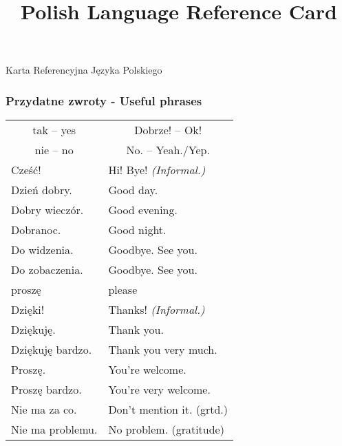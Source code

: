 \documentclass[12pt]{refcard}
\title{Polish Language Reference Card}
\newcommand{\singlec}[1]{\multicolumn{1}{c}{#1}}
\begin{document}
\centering

\maketitle
\vspace{-1ex}
Karta Referencyjna Języka Polskiego

\subsubsection{Przydatne zwroty - Useful phrases}
\vspace{-1ex}
\begin{tabular}{ll}
\singlec{tak -- yes}   & \singlec{Dobrze! -- Ok!}       \\
\singlec{nie -- no}    & \singlec{No. -- Yeah./Yep.}    \\[1ex]

Cześć!                 & Hi! Bye! \emph{(Informal.)}    \\
Dzień dobry.           & Good day.                      \\
Dobry wieczór.         & Good evening.                  \\
Dobranoc.              & Good night.                    \\
Do widzenia.           & Goodbye.  See you.             \\
Do zobaczenia.         & Goodbye.  See you.             \\[1ex]

proszę                 & please                         \\
Dzięki!                & Thanks! \emph{(Informal.)}     \\
Dziękuję.              & Thank you.                     \\
Dziękuję bardzo.       & Thank you very much.           \\[1ex]

Proszę.                & You're welcome.                \\
Proszę bardzo.         & You're very welcome.           \\
Nie ma za co.          & Don't mention it. (grtd.)      \\
Nie ma problemu.       & No problem. (gratitude)        \\[1ex]


\end{tabular}
\end{document}
